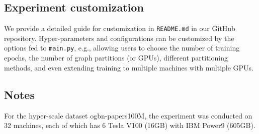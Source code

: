 \documentclass{article}
\begin{document}
\subsection{Experiment customization}
We provide a detailed guide for customization in \texttt{README.md} in our GitHub repository.
Hyper-parameters and configurations can be customized by the options fed to \texttt{main.py}, e.g., allowing users to choose the number of training epochs, the number of graph partitions (or GPUs), different partitioning methods, and even extending training to multiple machines with multiple GPUs.

\subsection{Notes}
For the hyper-scale dataset ogbn-papers100M, the experiment was conducted on 32 machines, each of which has 6 Tesla V100 (16GB) with IBM Power9 (605GB).



 
\end{document}
